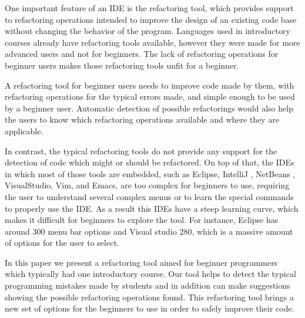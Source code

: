 One important feature of an IDE is the refactoring tool, %
which provides support to refactoring operations intended to improve the design
of an existing code base \cite{fowler1999refactoring} without changing the behavior of the program.
Languages used in introductory courses already have refactoring tools available,
however they were made for more advanced users and not for beginners.
The lack of refactoring operations for beginner users makes those refactoring tools
unfit for a beginner.

A refactoring tool for beginner users needs to improve code made by them, %
with refactoring operations for the typical errors made, and simple enough to be
used by a beginner user.
Automatic detection of possible refactorings would also help the users to know
which refactoring operations available and where they are applicable.

In contrast, the typical refactoring tools do not provide any support for the detection of code which might or should %
be refactored.
On top of that, the IDEs in which most of those tools are embedded, such as Eclipse\cite{carlson2005eclipse},
 IntelliJ \cite{bock2011intellij}, NetBeans \cite{boudreau2002netbeans}, VisualStudio\cite{ford2011coding},
 Vim\cite{moolenaar2008vim}, and Emacs\cite{stallman2007gnu}, are too complex for beginners
 to use, requiring the user to understand several complex menus or to learn
 the special commands to properly use the IDE.
As a result this IDEs have a steep learning curve, which makes it difficult for beginners
to explore the tool. %
For instance, Eclipse has around 300 menu bar options and Visual studio 280, which is a massive amount
of options for the user to select.


In this paper we present a refactoring tool aimed for beginner programmers which typically
had one introductory course.
Our tool helps to detect the typical programming mistakes made by students and in
addition can make suggestions showing the possible refactoring operations found.
This refactoring tool brings a new set of options for the beginners to use
in order to safely improve their code.


